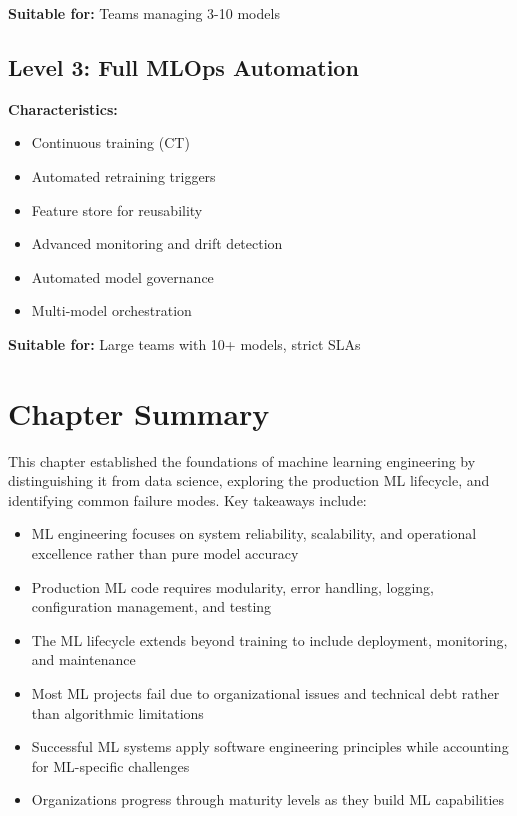 \textbf{Suitable for:} Teams managing 3-10 models

\subsection{Level 3: Full MLOps Automation}

\textbf{Characteristics:}
\begin{itemize}
    \item Continuous training (CT)
    \item Automated retraining triggers
    \item Feature store for reusability
    \item Advanced monitoring and drift detection
    \item Automated model governance
    \item Multi-model orchestration
\end{itemize}

\textbf{Suitable for:} Large teams with 10+ models, strict SLAs

\section{Chapter Summary}

This chapter established the foundations of machine learning engineering by distinguishing it from data science, exploring the production ML lifecycle, and identifying common failure modes. Key takeaways include:

\begin{itemize}
    \item ML engineering focuses on system reliability, scalability, and operational excellence rather than pure model accuracy
    \item Production ML code requires modularity, error handling, logging, configuration management, and testing
    \item The ML lifecycle extends beyond training to include deployment, monitoring, and maintenance
    \item Most ML projects fail due to organizational issues and technical debt rather than algorithmic limitations
    \item Successful ML systems apply software engineering principles while accounting for ML-specific challenges
    \item Organizations progress through maturity levels as they build ML capabilities
\end{itemize}

